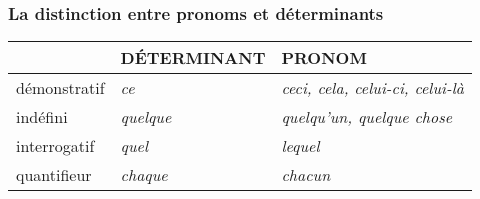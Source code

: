 \documentclass[UTF8]{report}
\begin{document}
\subsubsection{La distinction entre pronoms et déterminants}

\begin{table}[H]
\centering
\begin{tabular}{|l|l|l|}
\hline
\rowcolor{cyan!20}
\textbf{} & \textbf{DÉTERMINANT} & \textbf{PRONOM} \\ \hline
démonstratif & \textit{ce} & \textit{ceci, cela, celui-ci, celui-là} \\ \hline
indéfini & \textit{quelque} & \textit{quelqu’un, quelque chose} \\ \hline
interrogatif & \textit{quel} & \textit{lequel} \\ \hline
quantifieur & \textit{chaque} & \textit{chacun} \\ \hline
\end{tabular}

\end{table}
\end{document}
